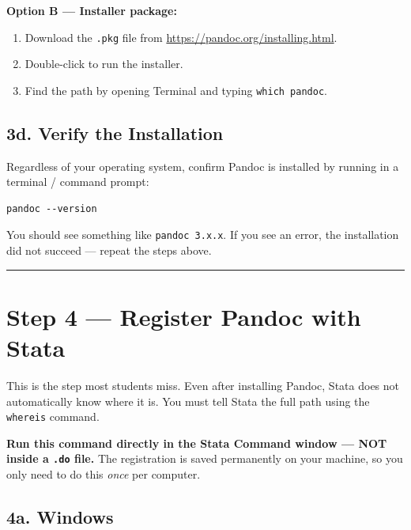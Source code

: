 \documentclass[paper=a4, fontsize=11pt]{scrartcl}
\newcommand{\horrule}[1]{\rule{\linewidth}{#1}}
\begin{document}
\textbf{Option B --- Installer package:}
\begin{enumerate}
  \item Download the \texttt{.pkg} file from \url{https://pandoc.org/installing.html}.
  \item Double-click to run the installer.
  \item Find the path by opening Terminal and typing \texttt{which pandoc}.
\end{enumerate}

\subsection*{3d. Verify the Installation}

Regardless of your operating system, confirm Pandoc is installed by running in a
terminal / command prompt:

\begin{lstlisting}[style=shell]
pandoc --version
\end{lstlisting}

You should see something like \texttt{pandoc 3.x.x}. If you see an error, the
installation did not succeed --- repeat the steps above.

\bigskip\horrule{0.4pt}\bigskip

\section{Step 4 --- Register Pandoc with Stata}

This is the step most students miss. Even after installing Pandoc, Stata does not
automatically know where it is. You must tell Stata the full path using the
\texttt{whereis} command.

\medskip
\begin{warnbox}
\textbf{Run this command directly in the Stata Command window --- NOT inside a
\texttt{.do} file.} The registration is saved permanently on your machine, so you
only need to do this \textit{once} per computer.
\end{warnbox}

\subsection*{4a. Windows}
\end{document}
